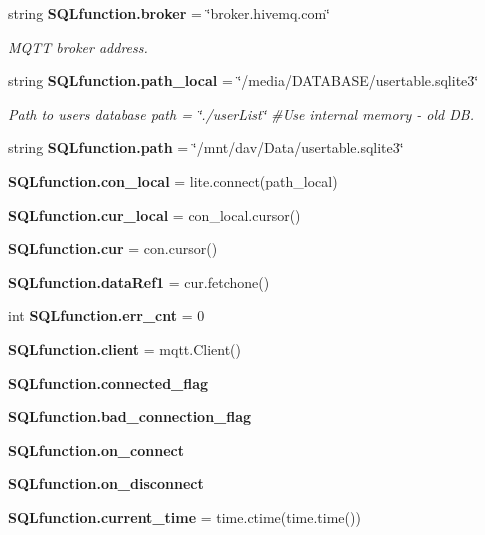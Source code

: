 \begin{DoxyCompactItemize}
string \textbf{ S\+Q\+Lfunction.\+broker} = \char`\"{}broker.\+hivemq.\+com\char`\"{}
\begin{DoxyCompactList}\small\item\em M\+Q\+TT broker address. \end{DoxyCompactList}\item 
string \textbf{ S\+Q\+Lfunction.\+path\+\_\+local} = \char`\"{}/media/D\+A\+T\+A\+B\+A\+SE/usertable.\+sqlite3\char`\"{}
\begin{DoxyCompactList}\small\item\em Path to users database path = \char`\"{}./user\+List\char`\"{} \#\+Use internal memory -\/ old DB. \end{DoxyCompactList}\item 
string \textbf{ S\+Q\+Lfunction.\+path} = \char`\"{}/mnt/dav/Data/usertable.\+sqlite3\char`\"{}
\item 
\textbf{ S\+Q\+Lfunction.\+con\+\_\+local} = lite.\+connect(path\+\_\+local)
\item 
\textbf{ S\+Q\+Lfunction.\+cur\+\_\+local} = con\+\_\+local.\+cursor()
\item 
\textbf{ S\+Q\+Lfunction.\+cur} = con.\+cursor()
\item 
\textbf{ S\+Q\+Lfunction.\+data\+Ref1} = cur.\+fetchone()
\item 
int \textbf{ S\+Q\+Lfunction.\+err\+\_\+cnt} = 0
\item 
\textbf{ S\+Q\+Lfunction.\+client} = mqtt.\+Client()
\item 
\textbf{ S\+Q\+Lfunction.\+connected\+\_\+flag}
\item 
\textbf{ S\+Q\+Lfunction.\+bad\+\_\+connection\+\_\+flag}
\item 
\textbf{ S\+Q\+Lfunction.\+on\+\_\+connect}
\item 
\textbf{ S\+Q\+Lfunction.\+on\+\_\+disconnect}
\item 
\textbf{ S\+Q\+Lfunction.\+current\+\_\+time} = time.\+ctime(time.\+time())
\end{DoxyCompactItemize}
